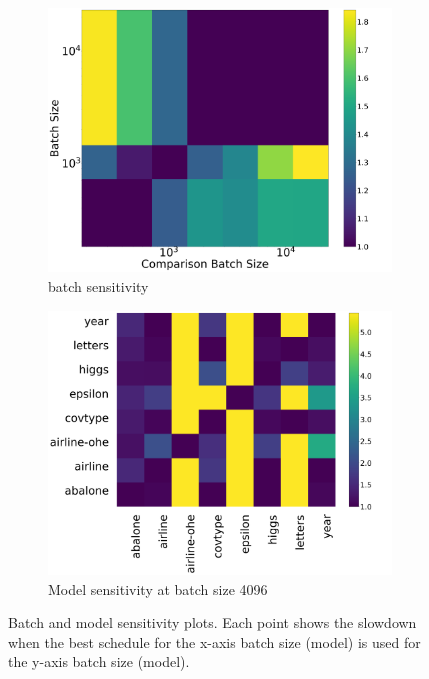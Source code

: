 \begin{figure}[htb]
  \begin{subfigure}[t]{.45\linewidth}
    \vspace{0pt}
    \centering
    \includegraphics[width=\linewidth]{figures/batch_sensitivity_covtype.png}
    \vspace{2pt}
    \caption{\label{fig:sensitivitya} batch sensitivity}
  \end{subfigure}\hfill
  \begin{subfigure}[t]{.52\linewidth}
    \vspace{0pt}
    \centering
    \includegraphics[width=\linewidth]{figures/model_sensitivity_4096.png}
    \caption{\label{fig:sensitivityb}Model sensitivity at batch size 4096}
  \end{subfigure}
  \caption{Batch and model sensitivity plots. Each point shows the slowdown when the best 
  schedule for the x-axis batch size (model) is used for the y-axis batch size (model).}
\end{figure}

